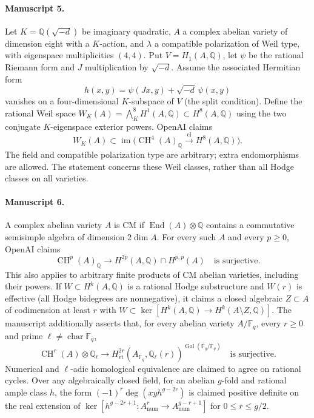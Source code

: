 \documentclass[11pt]{article}
\begin{document}
\paragraph{Manuscript 5.}
Let $K=\mathbb Q(\sqrt{-d})$ be imaginary quadratic, $A$ a complex abelian variety of dimension eight with a $K$-action, and $\lambda$ a compatible polarization of Weil type, with eigenspace multiplicities $(4,4)$. Put $V=H_1(A,\mathbb Q)$, let $\psi$ be the rational Riemann form and $J$ multiplication by $\sqrt{-d}$. Assume the associated Hermitian form
\[
h(x,y)=\psi(Jx,y)+\sqrt{-d}\,\psi(x,y)
\]
vanishes on a four-dimensional $K$-subspace of $V$ (the split condition). Define the rational Weil space $W_K(A)=\bigwedge_K^8H^1(A,\mathbb Q)\subset H^8(A,\mathbb Q)$ using the two conjugate $K$-eigenspace exterior powers. OpenAI claims
\[
W_K(A)\subset\operatorname{im}\bigl(\operatorname{CH}^4(A)_{\mathbb Q}\xrightarrow{\operatorname{cl}}H^8(A,\mathbb Q)\bigr).
\]
The field and compatible polarization type are arbitrary; extra endomorphisms are allowed. The statement concerns these Weil classes, rather than all Hodge classes on all varieties.

\paragraph{Manuscript 6.}
A complex abelian variety $A$ is CM if $\operatorname{End}(A)\otimes\mathbb Q$ contains a commutative semisimple algebra of dimension $2\dim A$. For every such $A$ and every $p\ge0$, OpenAI claims
\[
\operatorname{CH}^p(A)_{\mathbb Q}\longrightarrow H^{2p}(A,\mathbb Q)\cap H^{p,p}(A)
\quad\text{is surjective}.
\]
This also applies to arbitrary finite products of CM abelian varieties, including their powers. If $W\subset H^k(A,\mathbb Q)$ is a rational Hodge substructure and $W(r)$ is effective (all Hodge bidegrees are nonnegative), it claims a closed algebraic $Z\subset A$ of codimension at least $r$ with $W\subset\ker[H^k(A,\mathbb Q)\to H^k(A\setminus Z,\mathbb Q)]$.
The manuscript additionally asserts that, for every abelian variety $A/\mathbb F_q$, every $r\ge0$ and prime $\ell\ne\operatorname{char}\mathbb F_q$,
\[
\operatorname{CH}^r(A)\otimes\mathbb Q_\ell\longrightarrow
H^{2r}_{\mathrm{\acute et}}(A_{\overline{\mathbb F}_q},\mathbb Q_\ell(r))^{\operatorname{Gal}(\overline{\mathbb F}_q/\mathbb F_q)}
\quad\text{is surjective}.
\]
Numerical and $\ell$-adic homological equivalence are claimed to agree on rational cycles. Over any algebraically closed field, for an abelian $g$-fold and rational ample class $h$, the form $(-1)^r\deg(xyh^{g-2r})$ is claimed positive definite on the real extension of $\ker[h^{g-2r+1}:A^r_{\mathrm{num}}\to A^{g-r+1}_{\mathrm{num}}]$ for $0\le r\le g/2$.
\end{document}

